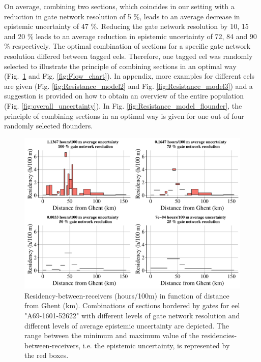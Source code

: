 \documentclass[preprint,12pt,authoryear]{elsarticle}
\begin{document}
\begin{spacing}{1.9}
On average, combining two sections, which coincides in our setting with a reduction in gate network resolution of 5 \%,  leads to an average decrease in epistemic uncertainty of 47 \%. Reducing the gate network resolution by 10, 15 and 20 \% leads to an average reduction in epistemic uncertainty of 72, 84 and 90 \% respectively. The optimal combination of sections for a specific gate network resolution differed between tagged eels. Therefore, one tagged eel was randomly selected to illustrate the principle of combining sections in an optimal way  (Fig.~\ref{fig:Resistance_model} and Fig. \ref{fig:Flow_chart}). In appendix, more examples for different eels are given (Fig. \ref{fig:Resistance_model2} and Fig. \ref{fig:Resistance_model3}) and a suggestion is provided on how to obtain an overview of the entire population (Fig. \ref{fig:overall_uncertainty}). In Fig. \ref{fig:Resistance_model_flounder}, the principle of combining sections in an optimal way is given for one out of four randomly selected flounders.

\begin{figure}[h!]
  \centering\includegraphics[scale=0.45]{Resistance_model2_jb_eel.pdf}
  \caption{Residency-between-receivers (hours/100m) in function of distance from Ghent (km). Combinations of sections bordered by gates for eel "A69-1601-52622" with different levels of gate network resolution and different levels of average epistemic uncertainty are depicted. The range between the minimum and maximum value of the residencies-between-receivers, i.e. the epistemic uncertainty, is represented by the red boxes.}
  \label{fig:Resistance_model}
\end{figure}


\end{spacing}
\end{document}
